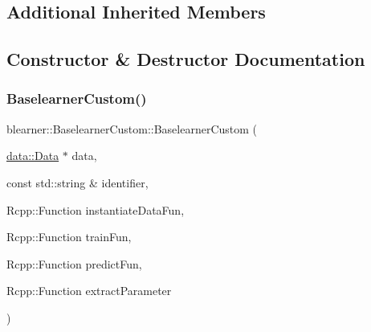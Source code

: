 \subsection*{Additional Inherited Members}


\subsection{Constructor \& Destructor Documentation}
\mbox{\label{classblearner_1_1_baselearner_custom_ac812a6b0d79f75560caa91ec101ca6e3}} 
\subsubsection{\texorpdfstring{Baselearner\+Custom()}{BaselearnerCustom()}}
{\footnotesize\ttfamily blearner\+::\+Baselearner\+Custom\+::\+Baselearner\+Custom (\begin{DoxyParamCaption}\item[{\mbox{\hyperlink{classdata_1_1_data}{data\+::\+Data}} $\ast$}]{data,  }\item[{const std\+::string \&}]{identifier,  }\item[{Rcpp\+::\+Function}]{instantiate\+Data\+Fun,  }\item[{Rcpp\+::\+Function}]{train\+Fun,  }\item[{Rcpp\+::\+Function}]{predict\+Fun,  }\item[{Rcpp\+::\+Function}]{extract\+Parameter }\end{DoxyParamCaption})}

